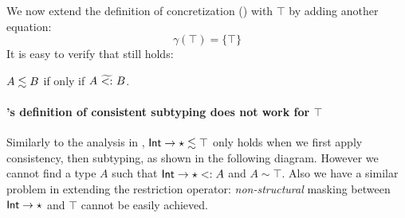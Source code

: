 We now extend the definition of concretization () with $\top$
by adding another equation:
\[
  \gamma(\top) = \{\top\}
\]
It is easy to verify that  still holds:
\begin{mprop}
  \label{prop:agt-top}
  $A \lesssim B$ if only if $A ~\widetilde{<:}~ B$.
\end{mprop}


\paragraph{\citeauthor{siek2007gradual}'s definition of consistent subtyping does not work for $\top$}

Similarly to the analysis in , $\mathsf{Int} \to \star
\lesssim \top$ only holds when we first apply consistency, then subtyping, as
shown in the following diagram. However we cannot find a type $A$ such that
$\mathsf{Int} \to \star <: A$ and $A \sim \top$. Also we have a similar problem in
extending the restriction operator: \textit{non-structural} masking between
$\mathsf{Int} \to \star$ and $\top$ cannot be easily achieved.
\begin{center}
\end{center}


